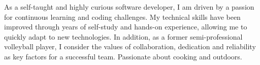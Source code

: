 

\begin{cvparagraph}
\hspace{8mm} As a self-taught and highly curious software developer, I am driven by a passion for
continuous learning and coding challenges. My technical skills have been improved
through years of self-study and hands-on experience, allowing me to quickly adapt to
new technologies. In addition, as a former semi-professional volleyball player, I consider
the values of collaboration, dedication and reliability as key factors for a successful
team. Passionate about cooking and outdoors.



\end{cvparagraph}
